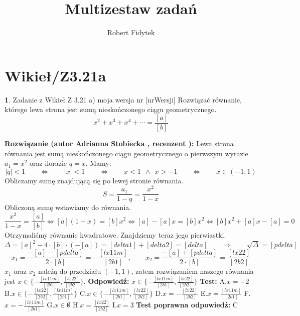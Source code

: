 \documentclass[12pt, a4paper]{article}
\title{Multizestaw zadań}
\author{Robert Fidytek}
\date{}
\theoremstyle{definition} %
\newtheorem{zad}{}
\newcommand{\kategoria}[1]{\section{#1}} %
\newcommand{\zadStart}[1]{\begin{zad}#1\newline} %
\newcommand{\zadStop}{\end{zad}}   %
\newcommand{\rozwStart}[2]{\noindent \textbf{Rozwiązanie (autor #1 , recenzent #2): }\newline} %
\newcommand{\rozwStop}{\newline}                                            %
\newcommand{\odpStart}{\noindent \textbf{Odpowiedź:}\newline}    %
\newcommand{\odpStop}{\newline}                                             %
\newcommand{\testStart}{\noindent \textbf{Test:}\newline} %
\newcommand{\testStop}{\newline} %
\newcommand{\kluczStart}{\noindent \textbf{Test poprawna odpowiedź:}\newline} %
\newcommand{\kluczStop}{\newline} %
\begin{document}
\maketitle


\kategoria{Wikieł/Z3.21a}
\zadStart{Zadanie z Wikieł Z 3.21 a) moja wersja nr [nrWersji]}
Rozwiązać równanie, którego lewa strona jest sumą nieskończonego ciągu geometrycznego.
$$x^2+x^3+x^4+\cdots=\frac{[a]}{[b]}$$
\zadStop
\rozwStart{Adrianna Stobiecka}{}
Lewa strona równania jest sumą nieskończonego ciągu geometrycznego o pierwszym wyrazie $a_1=x^2$ oraz ilorazie $q=x$. Mamy:
$$|q|<1\qquad\Leftrightarrow\qquad|x|<1\qquad\Leftrightarrow\qquad x<1~~\land~~x>-1\qquad\Leftrightarrow\qquad x\in(-1,1)$$
Obliczamy sumę znajdującą się po lewej stronie równania.
$$S=\frac{a_1}{1-q}=\frac{x^2}{1-x}$$
Obliczoną sumę wstawiamy do równania.
$$\frac{x^2}{1-x}=\frac{[a]}{[b]}\Leftrightarrow[a](1-x)=[b]x^2\Leftrightarrow[a]-[a]x=[b]x^2\Leftrightarrow[b]x^2+[a]x-[a]=0$$
Otrzymaliśmy równanie kwadratowe. Znajdziemy teraz jego pierwiastki.
$$\Delta=[a]^2-4\cdot[b]\cdot(-[a])=[delta1]+[delta2]=[delta]\qquad\Rightarrow\qquad\sqrt{\Delta}=[pdelta]$$
$$x_1=\frac{-[a]-[pdelta]}{2\cdot[b]}=-\frac{[lx11m]}{[2b1]},\qquad x_2=\frac{-[a]+[pdelta]}{2\cdot[b]}=\frac{[lx22]}{[2b2]}$$
$x_1$ oraz $x_2$ należą do przedziału $(-1,1)$, zatem rozwiązaniem naszego równania jest $x\in\{-\frac{[lx11m]}{[2b1]},\frac{[lx22]}{[2b2]}\}$.
\rozwStop
\odpStart
$x\in\{-\frac{[lx11m]}{[2b1]},\frac{[lx22]}{[2b2]}\}$
\odpStop
\testStart
A.$x=-2$
B.$x\in\{-\frac{[lx22]}{[2b2]},\frac{[lx11m]}{[2b1]}\}$
C.$x\in\{-\frac{[lx11m]}{[2b1]},\frac{[lx22]}{[2b2]}\}$
D.$x=-\frac{[lx22]}{[2b2]}$
E.$x=\frac{[lx11m]}{[2b1]}$
F.$x=-\frac{[lx11m]}{[2b1]}$
G.$x\in\emptyset$
H.$x=\frac{[lx22]}{[2b2]}$
I.$x=3$
\testStop
\kluczStart
C
\kluczStop
\end{document}
